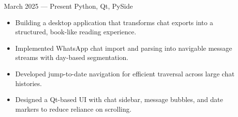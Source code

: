 {March 2025 --- Present}
{Python, Qt, PySide}
\begin{itemize}
  \item Building a desktop application that transforms chat exports into a structured, book-like reading experience.
  \item Implemented WhatsApp chat import and parsing into navigable message streams with day-based segmentation.
  \item Developed jump-to-date navigation for efficient traversal across large chat histories.
  \item Designed a Qt-based UI with chat sidebar, message bubbles, and date markers to reduce reliance on scrolling.
\end{itemize}
